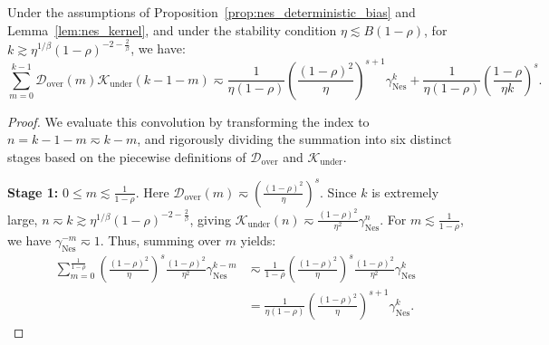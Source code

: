 \begin{lemma}
\label{lem:nes_conv_over_under}
Under the assumptions of Proposition~\ref{prop:nes_deterministic_bias} and Lemma~\ref{lem:nes_kernel}, and under the stability condition $\eta\lesssim B(1-\rho)$, for $k \gtrsim \eta^{1/\beta}(1-\rho)^{-2-\frac{2}{\beta}}$, we have:
\begin{equation*}
    \sum_{m=0}^{k-1} \mathcal{D}_{\mathrm{over}}(m) \mathcal{K}_{\mathrm{under}}(k-1-m) \eqsim \frac{1}{\eta(1-\rho)} \left(\frac{(1-\rho)^2}{\eta}\right)^{s+1} \gamma_{\mathrm{Nes}}^k + \frac{1}{\eta(1-\rho)} \left(\frac{1-\rho}{\eta k}\right)^s.
\end{equation*}
\end{lemma}
\begin{proof}
We evaluate this convolution by transforming the index to $n = k-1-m \eqsim k-m$, and rigorously dividing the summation into six distinct stages based on the piecewise definitions of $\mathcal{D}_{\mathrm{over}}$ and $\mathcal{K}_{\mathrm{under}}$.

\textbf{Stage 1:} $0 \le m \lesssim \frac{1}{1-\rho}$. 
Here $\mathcal{D}_{\mathrm{over}}(m) \eqsim \left(\frac{(1-\rho)^2}{\eta}\right)^s$. Since $k$ is extremely large, $n \eqsim k \gtrsim \eta^{1/\beta}(1-\rho)^{-2-\frac{2}{\beta}}$, giving $\mathcal{K}_{\mathrm{under}}(n) \eqsim \frac{(1-\rho)^2}{\eta^2} \gamma_{\mathrm{Nes}}^n$. For $m \lesssim \frac{1}{1-\rho}$, we have $\gamma_{\mathrm{Nes}}^{-m} \eqsim 1$. Thus, summing over $m$ yields:
\begin{align*}
    \sum_{m=0}^{\frac{1}{1-\rho}} \left(\frac{(1-\rho)^2}{\eta}\right)^s \frac{(1-\rho)^2}{\eta^2} \gamma_{\mathrm{Nes}}^{k-m} 
    &\eqsim \frac{1}{1-\rho} \left(\frac{(1-\rho)^2}{\eta}\right)^s \frac{(1-\rho)^2}{\eta^2} \gamma_{\mathrm{Nes}}^k \\
    &= \frac{1}{\eta(1-\rho)} \left(\frac{(1-\rho)^2}{\eta}\right)^{s+1} \gamma_{\mathrm{Nes}}^k.
\end{align*}


\end{proof}

